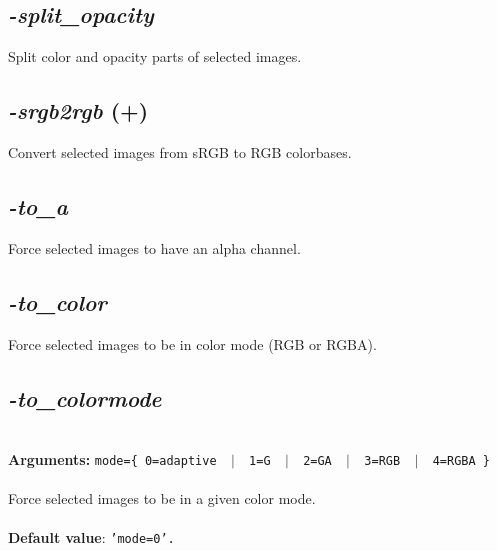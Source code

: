 \documentclass[a4paper,11pt,twoside]{book}
\begin{document}
\subsection{\emph{-split\_opacity} }\vspace*{-0.5em}
Split color and opacity parts of selected images.


\subsection{\emph{-srgb2rgb} (+)}\vspace*{-0.5em}
Convert selected images from sRGB to RGB colorbases.


\subsection{\emph{-to\_a} }\vspace*{-0.5em}
Force selected images to have an alpha channel.


\subsection{\emph{-to\_color} }\vspace*{-0.5em}
Force selected images to be in color mode (RGB or RGBA).


\subsection{\emph{-to\_colormode} }\vspace*{-0.5em}
~\\\textbf{Arguments: } 
{\small \texttt{mode=\{ 0=adaptive ~$|$~ 1=G ~$|$~ 2=GA ~$|$~ 3=RGB ~$|$~ 4=RGBA \}}}\\~\\
Force selected images to be in a given color mode.
~\\~\\\textbf{Default value}: {\small \texttt{'mode=0'.}}
\end{document}

